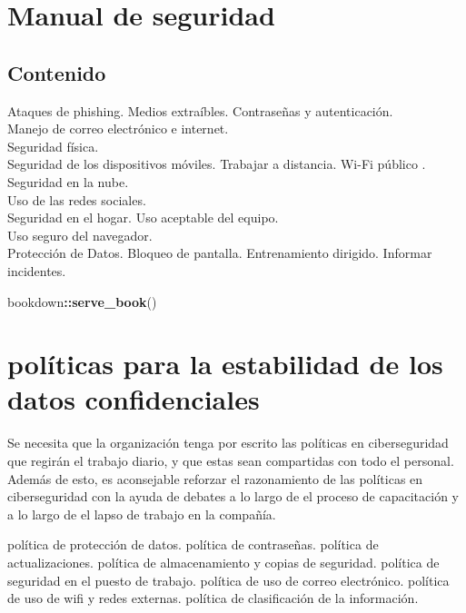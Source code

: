 \documentclass[
]{article}
\author{}
\date{\vspace{-2.5em}}
\newenvironment{Shaded}{\begin{snugshade}}{\end{snugshade}}
\newcommand{\KeywordTok}[1]{\textcolor[rgb]{0.13,0.29,0.53}{\textbf{#1}}}
\newcommand{\NormalTok}[1]{#1}
\newcommand{\OperatorTok}[1]{\textcolor[rgb]{0.81,0.36,0.00}{\textbf{#1}}}
\begin{document}
{
\setcounter{tocdepth}{2}
\tableofcontents
}
\hypertarget{manual-de-seguridad}{%
\section{Manual de seguridad}\label{manual-de-seguridad}}

\hypertarget{contenido}{%
\subsection{Contenido}\label{contenido}}

Ataques de phishing.
Medios extraíbles.
Contraseñas y autenticación.\\
Manejo de correo electrónico e internet.\\
Seguridad física.\\
Seguridad de los dispositivos móviles.
Trabajar a distancia.
Wi-Fi público .
Seguridad en la nube.\\
Uso de las redes sociales.\\
Seguridad en el hogar.
Uso aceptable del equipo.\\
Uso seguro del navegador.\\
Protección de Datos.
Bloqueo de pantalla.
Entrenamiento dirigido.
Informar incidentes.

\begin{Shaded}
\begin{Highlighting}[]
\NormalTok{bookdown}\OperatorTok{::}\KeywordTok{serve_book}\NormalTok{()}
\end{Highlighting}
\end{Shaded}

\hypertarget{poluxedticas-para-la-estabilidad-de-los-datos-confidenciales}{%
\section{políticas para la estabilidad de los datos confidenciales}\label{poluxedticas-para-la-estabilidad-de-los-datos-confidenciales}}

Se necesita que la organización tenga por escrito las políticas en ciberseguridad que regirán el trabajo diario, y que estas sean compartidas con todo el personal. Además de esto, es aconsejable reforzar el razonamiento de las políticas en ciberseguridad con la ayuda de debates a lo largo de el proceso de capacitación y a lo largo de el lapso de trabajo en la compañía.

política de protección de datos.
política de contraseñas.
política de actualizaciones.
política de almacenamiento y copias de seguridad.
política de seguridad en el puesto de trabajo.
política de uso de correo electrónico.
política de uso de wifi y redes externas.
política de clasificación de la información.
\end{document}
